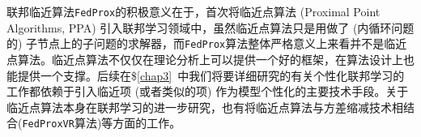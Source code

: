 联邦临近算法\texttt{FedProx}的积极意义在于，首次将临近点算法 (Proximal Point Algorithms, PPA) 引入联邦学习领域中，虽然临近点算法只是用做了 (内循环问题的) 子节点上的子问题的求解器，而\texttt{FedProx}算法整体严格意义上来看并不是临近点算法。临近点算法不仅仅在理论分析上可以提供一个好的框架，在算法设计上也能提供一个支撑。后续在\$\ref{chap3}~中我们将要详细研究的有关个性化联邦学习的工作\cite{hanzely2020federated,acar2021feddyn,li_2021_ditto,t2020pfedme,li2021pfedmac}都依赖于引入临近项 (或者类似的项) 作为模型个性化的主要技术手段。关于临近点算法本身在联邦学习的进一步研究，也有将临近点算法与方差缩减技术相结合(\texttt{FedProxVR}算法)\cite{Dinh_2020_FL_PSVRG}等方面的工作。

